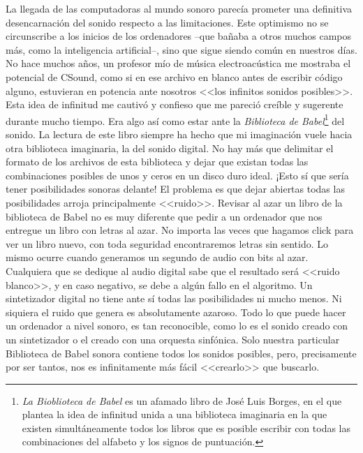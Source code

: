 La llegada de las computadoras al mundo sonoro parecía prometer una definitiva desencarnación del sonido respecto a las limitaciones. Este optimismo no se circunscribe a los inicios de los ordenadores --que bañaba a otros muchos campos más, como la inteligencia artificial--, sino que sigue siendo común en nuestros días. No hace muchos años, un profesor mío de música electroacústica me mostraba el potencial de CSound, como si en ese archivo en blanco antes de escribir código alguno, estuvieran en potencia ante nosotros <<los infinitos sonidos posibles>>. Esta idea de infinitud me cautivó y confieso que me pareció creíble y sugerente durante mucho tiempo. Era algo así como estar ante la \textit{Biblioteca de Babel}\footnote{\textit{La Bioblioteca de Babel} es un afamado libro de José Luis Borges, en el que plantea la idea de infinitud unida a una biblioteca imaginaria en la que existen simultáneamente todos los libros que es posible escribir con todas las combinaciones del alfabeto y los signos de puntuación.} del sonido. La lectura de este libro siempre ha hecho que mi imaginación vuele hacia otra biblioteca imaginaria, la del sonido digital. No hay más que delimitar el formato de los archivos de esta biblioteca y dejar que existan todas las combinaciones posibles de unos y ceros en un disco duro ideal. ¡Esto sí que sería tener posibilidades sonoras delante! El problema es que dejar abiertas todas las posibilidades arroja principalmente <<ruido>>. Revisar al azar un libro de la biblioteca de Babel no es muy diferente que pedir a un ordenador que nos entregue un libro con letras al azar. No importa las veces que hagamos click para ver un libro nuevo, con toda seguridad encontraremos letras sin sentido. Lo mismo ocurre cuando generamos un segundo de audio con bits al azar. Cualquiera que se dedique al audio digital sabe que el resultado será <<ruido blanco>>, y en caso negativo, se debe a algún fallo en el algoritmo. Un sintetizador digital no tiene ante sí todas las posibilidades ni mucho menos. Ni siquiera el ruido que genera es absolutamente azaroso. Todo lo que puede hacer un ordenador a nivel sonoro, es tan reconocible, como lo es el sonido creado con un sintetizador o el creado con una orquesta sinfónica. Solo nuestra particular Biblioteca de Babel sonora contiene todos los sonidos posibles, pero, precisamente por ser tantos, nos es infinitamente más fácil <<crearlo>> que buscarlo.

